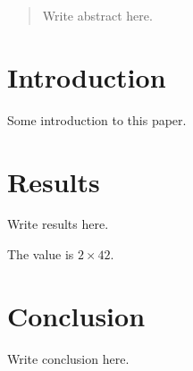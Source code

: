 \documentclass{article}
\begin{document}
\begin{abstract}
Write abstract here.
\end{abstract}

\section{Introduction}

Some introduction to this paper.

\section{Results}

Write results here.

The value is $2 \times 42$.

\section{Conclusion}

Write conclusion here.
\end{document}
